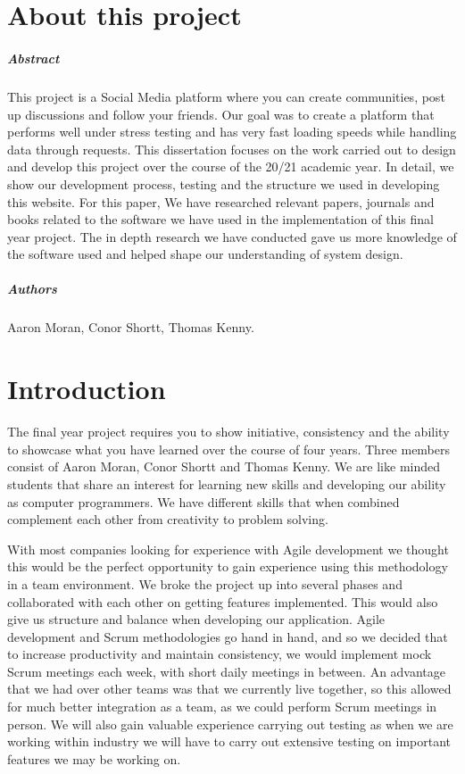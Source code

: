 
\chapter*{About this project}
\paragraph{Abstract}
This project is a Social Media platform where you can create communities, post up discussions and follow your friends. Our goal was to create a platform that performs well under stress testing and has very fast loading speeds while handling data through requests.
This dissertation focuses on the work carried out to design and develop this project over the course of the 20/21 academic year. In detail, we show our development process, testing and the structure we used in developing this website. For this paper, We have researched relevant papers, journals and books related to the software we have used in the implementation of this final year project. The in depth research we have conducted gave us more knowledge of the software used and helped shape our understanding of system design. 

\paragraph{Authors}
Aaron Moran, Conor Shortt, Thomas Kenny.

\chapter{Introduction}
The final year project requires you to show initiative, consistency and the ability to showcase what you have learned over the course of four years.
Three members consist of Aaron Moran, Conor Shortt and Thomas Kenny. We are like minded students that share an interest for learning new skills and developing our ability as computer programmers. We have different skills that when combined complement each other from creativity to problem solving. 
\newline

With most companies looking for experience with Agile development we thought this would be the perfect opportunity to gain experience using this methodology in a team environment. We broke the project up into several phases and collaborated with each other on getting features implemented. This would also give us structure and balance when developing our application. Agile development and Scrum methodologies go hand in hand, and so we decided that to increase productivity and maintain consistency, we would implement mock Scrum meetings each week, with short daily meetings in between. An advantage that we had over other teams was that we currently live together, so this allowed for much better integration as a team, as we could perform Scrum meetings in person. We will also gain valuable experience carrying out testing as when we are working within industry we will have to carry out extensive testing on important features we may be working on.
\newline


